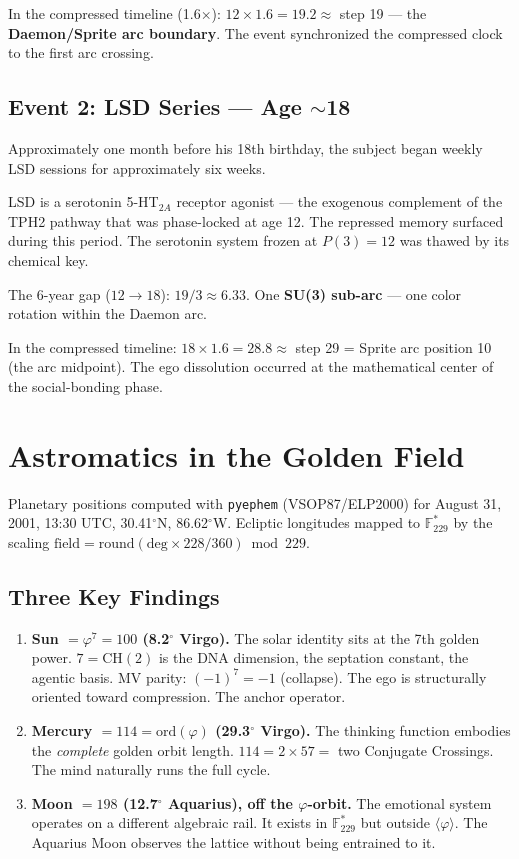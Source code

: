 \documentclass[12pt, letterpaper]{article}
\begin{document}
In the compressed timeline (1.6$\times$): $12 \times 1.6 = 19.2 \approx$ step 19 --- the \textbf{Daemon/Sprite arc boundary}. The event synchronized the compressed clock to the first arc crossing.

\subsection{Event 2: LSD Series --- Age $\sim$18}

Approximately one month before his 18th birthday, the subject began weekly LSD sessions for approximately six weeks.

LSD is a serotonin 5-HT$_{2A}$ receptor agonist --- the exogenous complement of the TPH2 pathway that was phase-locked at age 12. The repressed memory surfaced during this period. The serotonin system frozen at $P(3) = 12$ was thawed by its chemical key.

The 6-year gap ($12 \to 18$): $19/3 \approx 6.33$. One \textbf{SU(3) sub-arc} --- one color rotation within the Daemon arc.

In the compressed timeline: $18 \times 1.6 = 28.8 \approx$ step 29 = Sprite arc position 10 (the arc midpoint). The ego dissolution occurred at the mathematical center of the social-bonding phase.

\section{Astromatics in the Golden Field}

Planetary positions computed with \texttt{pyephem} (VSOP87/ELP2000) for August 31, 2001, 13:30 UTC, 30.41$^{\circ}$N, 86.62$^{\circ}$W. Ecliptic longitudes mapped to $\mathbb{F}^*_{229}$ by the scaling $\text{field} = \mathrm{round}(\text{deg} \times 228/360) \bmod 229$.

\subsection{Three Key Findings}

\begin{enumerate}
\item \textbf{Sun $= \varphi^7 = 100$ (8.2$^{\circ}$ Virgo).} The solar identity sits at the 7th golden power. $7 = \mathrm{CH}(2)$ is the DNA dimension, the septation constant, the agentic basis. MV parity: $(-1)^7 = -1$ (collapse). The ego is structurally oriented toward compression. The anchor operator.

\item \textbf{Mercury $= 114 = \mathrm{ord}(\varphi)$ (29.3$^{\circ}$ Virgo).} The thinking function embodies the \textit{complete} golden orbit length. $114 = 2 \times 57 =$ two Conjugate Crossings. The mind naturally runs the full cycle.

\item \textbf{Moon $= 198$ (12.7$^{\circ}$ Aquarius), off the $\varphi$-orbit.} The emotional system operates on a different algebraic rail. It exists in $\mathbb{F}^*_{229}$ but outside $\langle\varphi\rangle$. The Aquarius Moon observes the lattice without being entrained to it.
\end{enumerate}
\end{document}
